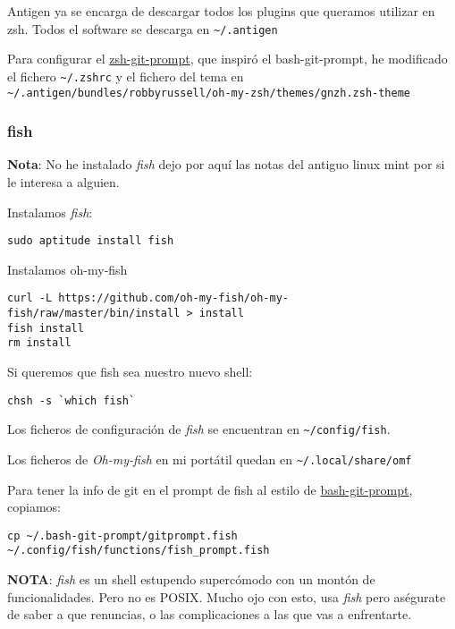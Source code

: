 \documentclass[
  12pt,
  spanish,
]{article}
\begin{document}
Antigen ya se encarga de descargar todos los plugins que queramos
utilizar en zsh. Todos el software se descarga en
\texttt{\textasciitilde{}/.antigen}

Para configurar el
\href{https://github.com/olivierverdier/zsh-git-prompt}{zsh-git-prompt},
que inspiró el bash-git-prompt, he modificado el fichero
\texttt{\textasciitilde{}/.zshrc} y el fichero del tema en
\texttt{\textasciitilde{}/.antigen/bundles/robbyrussell/oh-my-zsh/themes/gnzh.zsh-theme}

\hypertarget{fish}{%
\subsubsection{fish}\label{fish}}

\textbf{Nota}: No he instalado \emph{fish} dejo por aquí las notas del
antiguo linux mint por si le interesa a alguien.

Instalamos \emph{fish}:

\begin{verbatim}
sudo aptitude install fish
\end{verbatim}

Instalamos oh-my-fish

\begin{verbatim}
curl -L https://github.com/oh-my-fish/oh-my-fish/raw/master/bin/install > install
fish install
rm install
\end{verbatim}

Si queremos que fish sea nuestro nuevo shell:

\begin{verbatim}
chsh -s `which fish`
\end{verbatim}

Los ficheros de configuración de \emph{fish} se encuentran en
\texttt{\textasciitilde{}/config/fish}.

Los ficheros de \emph{Oh-my-fish} en mi portátil quedan en
\texttt{\textasciitilde{}/.local/share/omf}

Para tener la info de git en el prompt de fish al estilo de
\href{https://github.com/magicmonty/bash-git-prompt}{bash-git-prompt},
copiamos:

\begin{verbatim}
cp ~/.bash-git-prompt/gitprompt.fish ~/.config/fish/functions/fish_prompt.fish
\end{verbatim}

\textbf{NOTA}: \emph{fish} es un shell estupendo supercómodo con un
montón de funcionalidades. Pero no es POSIX. Mucho ojo con esto, usa
\emph{fish} pero aségurate de saber a que renuncias, o las
complicaciones a las que vas a enfrentarte.
\end{document}
